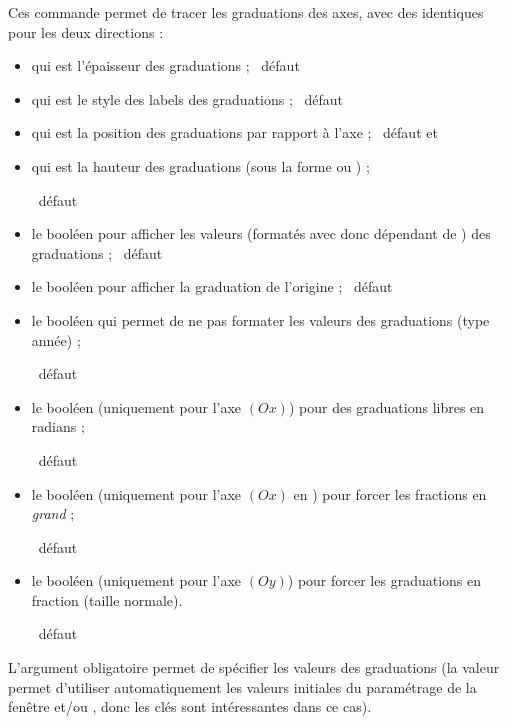 \begin{cautionblock}
Ces commande permet de tracer les graduations des axes, avec des  identiques pour les deux directions :

\begin{itemize}
	\item {} qui est l'épaisseur des graduations ; \hfill~défaut \Cle{1pt}
	\item {} qui est le style des labels des graduations ; \hfill~défaut 
	\item {} qui est la position des graduations par rapport à l'axe ; \hfill~défaut  et 
	\item {} qui est la hauteur des graduations (sous la forme  ou ) ;
	
	\hfill~défaut \Cle{4pt}
	\item le booléen  pour afficher les valeurs (formatés avec  donc dépendant de ) des graduations  ; \hfill~défaut 
	\item le booléen  pour afficher la graduation de l'origine ; \hfill~défaut 
	\item le booléen  qui permet de ne pas formater les valeurs des graduations (type \textsf{année}) ;
	
	\hfill~défaut 
	\item {} le booléen  (uniquement pour l'axe $(Ox)$) pour des graduations libres en radians ;
	
	\hfill~défaut 
	\item {} le booléen  (uniquement pour l'axe $(Ox)$ en ) pour forcer les fractions en \textit{grand} ;
	
	\hfill~défaut 
	\item {} le booléen  (uniquement pour l'axe $(Oy)$) pour forcer les graduations en fraction (taille normale).
	
	\hfill~défaut 
\end{itemize}

 L'argument obligatoire permet de spécifier les valeurs des graduations (la valeur  permet d'utiliser automatiquement les valeurs initiales du paramétrage de la fenêtre  et/ou , donc les clés  sont intéressantes dans ce cas).

\end{cautionblock}

